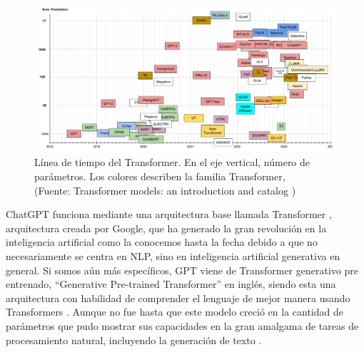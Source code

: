 \begin{figure}[ht!]
    \centering
    \includegraphics[width=.8\textwidth]{figures/ea4.png}
    \caption[Línea de tiempo del Transformer]{Línea de tiempo del Transformer. En el eje vertical, número de parámetros.
    Los colores describen la familia Transformer,\\
    {\scriptsize (Fuente: Transformer models: an introduction and catalog \cite{eb4s})}}

    \label{fig:ea3}
\end{figure}

\par ChatGPT funciona mediante una arquitectura base llamada Transformer \cite{aiayn}, arquitectura creada por Google, que ha generado 
la gran revolución en la inteligencia artificial como la conocemos hasta la fecha debido a que no necesariamente se centra en NLP, 
sino en inteligencia artificial generativa en general. Si somos aún más específicos, GPT viene de Transformer generativo 
pre entrenado, ``Generative Pre-trained Transformer'' en inglés, siendo esta una arquitectura con habilidad de comprender el 
lenguaje de mejor manera usando Transformers \cite{mt4}. Aunque no fue hasta que este modelo creció en la cantidad de parámetros que 
pudo mostrar sus capacidades en la gran amalgama de tareas de procesamiento natural, incluyendo la generación de texto \cite{mt5}.


